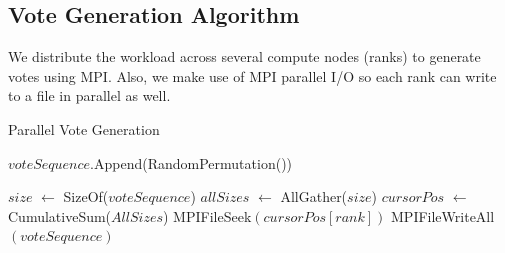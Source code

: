 \documentclass[final,5p,times,twocolumn,authoryear, 10pt]{elsarticle}
\begin{document}
\subsection{Vote Generation Algorithm}
\label{Vote Generation Algorithm}
We distribute the workload across several compute nodes (ranks) to generate
votes using MPI. Also, we make use of MPI parallel I/O so each rank can write
to a file in parallel as well.
\begin{algorithm}
    \caption{Parallel Vote Generation}\label{alg:cap}
    \begin{algorithmic}[1]
        \State $voteSequence$.Append(RandomPermutation())
    \EndFor

    \State $size$ $\gets$ SizeOf($voteSequence$)
    \State $allSizes$ $\gets$ AllGather($size$) 
    \State $cursorPos$ $\gets$ CumulativeSum($AllSizes$)
    \State MPIFileSeek$(cursorPos[rank])$
    \State MPIFileWriteAll$(voteSequence)$
    \EndProcedure
    \end{algorithmic}
\end{algorithm}
\end{document}
